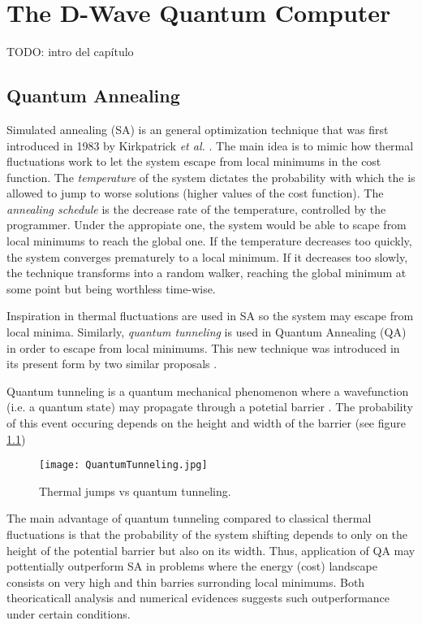 \chapter{The D-Wave Quantum Computer}


TODO: intro del capítulo


\section{Quantum Annealing}


Simulated annealing (SA) is an general optimization technique that was first introduced in 1983 by Kirkpatrick \emph{et al.} \cite{Kirkpatrick1983}. The main idea is to mimic how thermal fluctuations work to let the system escape from local minimums in the cost function. The \emph{temperature} of the system dictates the probability with which the is allowed to jump to worse solutions (higher values of the cost function). The \emph{annealing schedule} is the decrease rate of the temperature, controlled by the programmer. Under the appropiate one, the system would be able to scape from local minimums to reach the global one. If the temperature decreases too quickly, the system converges prematurely to a local minimum. If it decreases too slowly, the technique transforms into a random walker, reaching the global minimum at some point but being worthless time-wise.

Inspiration in thermal fluctuations are used in SA so the system may escape from local minima. Similarly, \emph{quantum tunneling} is used in Quantum Annealing (QA) in order to escape from local minimums. This new technique was introduced in its present form by two similar proposals \cite{Finnila1994} \cite{Kadowaki1998}.

Quantum tunneling is a quantum mechanical phenomenon where a wavefunction (i.e. a quantum state) may propagate through a potetial barrier \cite{Nimtz2008}. The probability of this event occuring depends on the height and width of the barrier (see figure \ref{fig 2.1})

\begin{figure}[h]
	\texttt{[image: QuantumTunneling.jpg]}
	\centering
	\caption{Thermal jumps vs quantum tunneling.}
	\label{fig 2.1}
\end{figure}

The main advantage of quantum tunneling compared to classical thermal fluctuations is that the probability of the system shifting depends to only on the height of the potential barrier but also on its width. Thus, application of QA may pottentially outperform SA in problems where the energy (cost) landscape consists on very high and thin barries surronding local minimums. Both theoricaticall analysis \cite{Morita2008} and numerical evidences \cite{Farhi2000} suggests such outperformance under certain conditions.

